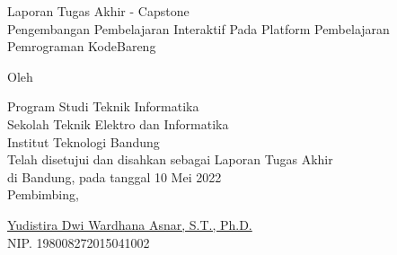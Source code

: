 \clearpage
\pagestyle{empty}

\begin{center}
    \smallskip

    \Large \bfseries \MakeUppercase{\thetitle}
    \vfill

    \Large Laporan Tugas Akhir - Capstone \\
    Pengembangan Pembelajaran Interaktif Pada Platform Pembelajaran Pemrograman KodeBareng
    \vfill

    \large Oleh

    \Large \theauthor

    \large Program Studi Teknik Informatika \\

    \normalsize \normalfont
    Sekolah Teknik Elektro dan Informatika \\
    Institut Teknologi Bandung \\

    \vfill
    \normalsize \normalfont
    Telah disetujui dan disahkan sebagai Laporan Tugas Akhir \\
    di Bandung, pada tanggal 10 Mei 2022 \\

    \vspace{0.3cm}
    Pembimbing,

    \vspace{2cm}
    \underline{Yudistira Dwi Wardhana Asnar, S.T., Ph.D.} \\
    NIP. 198008272015041002

\end{center}
\clearpage
